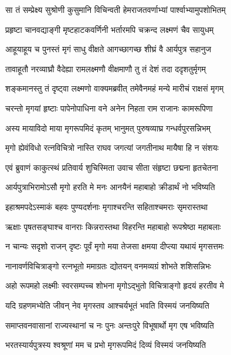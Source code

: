 
\twolineshloka
{सा तं सम्प्रेक्ष्य सुश्रोणी कुसुमानि विचिन्वती}
{हेमराजतवर्णाभ्यां पार्श्वाभ्यामुपशोभितम्} %

\twolineshloka
{प्रहृष्टा चानवद्याङ्गी मृष्टहाटकवर्णिनी}
{भर्तारमपि चक्रन्द लक्ष्मणं चैव सायुधम्} %

\twolineshloka
{आहूयाहूय च पुनस्तं मृगं साधु वीक्षते}
{आगच्छागच्छ शीघ्रं वै आर्यपुत्र सहानुज} %

\twolineshloka
{तावाहूतौ नरव्याघ्रौ वैदेह्या रामलक्ष्मणौ}
{वीक्षमाणौ तु तं देशं तदा ददृशतुर्मृगम्} %

\twolineshloka
{शङ्कमानस्तु तं दृष्ट्वा लक्ष्मणो वाक्यमब्रवीत्}
{तमेवैनमहं मन्ये मारीचं राक्षसं मृगम्} %

\twolineshloka
{चरन्तो मृगयां हृष्टाः पापेनोपाधिना वने}
{अनेन निहता राम राजानः कामरूपिणा} %

\twolineshloka
{अस्य मायाविदो माया मृगरूपमिदं कृतम्}
{भानुमत् पुरुषव्याघ्र गन्धर्वपुरसन्निभम्} %

\twolineshloka
{मृगो ह्येवंविधो रत्नविचित्रो नास्ति राघव}
{जगत्यां जगतीनाथ मायैषा हि न संशयः} %

\twolineshloka
{एवं ब्रुवाणं काकुत्स्थं प्रतिवार्य शुचिस्मिता}
{उवाच सीता संहृष्टा छद्मना हृतचेतना} %

\twolineshloka
{आर्यपुत्राभिरामोऽसौ मृगो हरति मे मनः}
{आनयैनं महाबाहो क्रीडार्थं नो भविष्यति} %

\twolineshloka
{इहाश्रमपदेऽस्माकं बहवः पुण्यदर्शनाः}
{मृगाश्चरन्ति सहिताश्चमराः सृमरास्तथा} %

\twolineshloka
{ऋक्षाः पृषतसङ्घाश्च वानराः किन्नरास्तथा}
{विहरन्ति महाबाहो रूपश्रेष्ठा महाबलाः} %

\twolineshloka
{न चान्यः सदृशो राजन् दृष्टः पूर्वं मृगो मया}
{तेजसा क्षमया दीप्त्या यथायं मृगसत्तमः} %

\twolineshloka
{नानावर्णविचित्राङ्गो रत्नभूतो ममाग्रतः}
{द्योतयन् वनमव्यग्रं शोभते शशिसन्निभः} %

\twolineshloka
{अहो रूपमहो लक्ष्मीः स्वरसम्पच्च शोभना}
{मृगोऽद्भुतो विचित्राङ्गो हृदयं हरतीव मे} %

\twolineshloka
{यदि ग्रहणमभ्येति जीवन् नेव मृगस्तव}
{आश्चर्यभूतं भवति विस्मयं जनयिष्यति} %

\twolineshloka
{समाप्तवनवासानां राज्यस्थानां च नः पुनः}
{अन्तःपुरे विभूषार्थो मृग एष भविष्यति} %

\twolineshloka
{भरतस्यार्यपुत्रस्य श्वश्रूणां मम च प्रभो}
{मृगरूपमिदं दिव्यं विस्मयं जनयिष्यति} %

